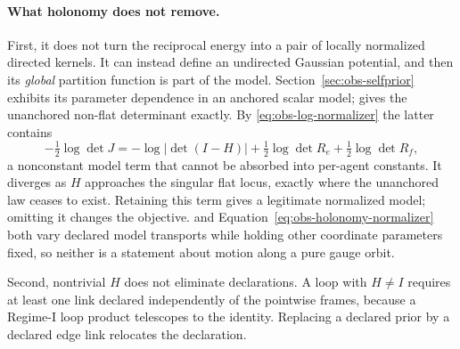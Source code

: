 \paragraph{What holonomy does not remove.}
First, it does not turn the reciprocal energy into a pair of locally normalized directed kernels. It can instead define an undirected Gaussian potential, and then its \emph{global} partition function is part of the model. Section~\ref{sec:obs-selfprior} exhibits its parameter dependence in an anchored scalar model;  gives the unanchored non-flat determinant exactly. By \eqref{eq:obs-log-normalizer} the latter contains
\begin{equation}
-\tfrac12\log\det J
=-\log\bigl\lvert\det(I-H)\bigr\rvert
+\tfrac12\log\det R_e
+\tfrac12\log\det R_f,
\label{eq:obs-holonomy-normalizer}
\end{equation}
a nonconstant model term that cannot be absorbed into per-agent constants. It diverges as \(H\) approaches the singular flat locus, exactly where the unanchored law ceases to exist. Retaining this term gives a legitimate normalized model; omitting it changes the objective.  and Equation~\eqref{eq:obs-holonomy-normalizer} both vary declared model transports while holding other coordinate parameters fixed, so neither is a statement about motion along a pure gauge orbit. 

Second, nontrivial \(H\) does not eliminate declarations. A loop with $H\neq I$ requires at least one link declared independently of the pointwise frames, because a Regime-I loop product telescopes to the identity. Replacing a declared prior by a declared edge link relocates the declaration. 

